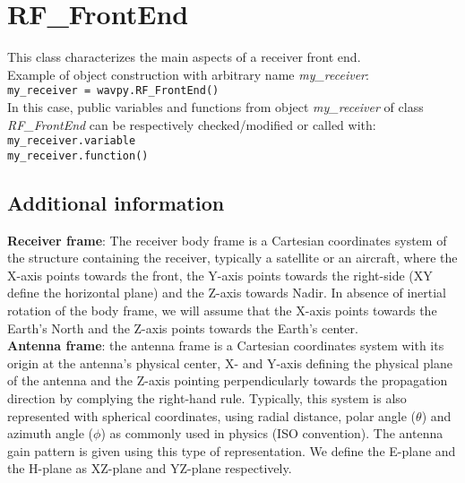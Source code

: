 \chapter{RF\_FrontEnd}\label{cha:rffe}

This class characterizes the main aspects of a receiver front end.\\

Example of object construction with arbitrary name {\it my\_receiver}:\\

\texttt{my\_receiver = wavpy.RF\_FrontEnd()}\\

In this case, public variables and functions from object {\it my\_receiver} of class {\it RF\_FrontEnd} can be respectively checked/modified or called with:\\

\texttt{my\_receiver.variable}\\

\texttt{my\_receiver.function()}\\

\section{Additional information}

{\bf Receiver frame}: The receiver body frame is a Cartesian coordinates system of the structure containing the receiver, typically a satellite or an aircraft, where the X-axis points towards the front, the Y-axis points towards the right-side (XY define the horizontal plane) and the Z-axis towards Nadir. In absence of inertial rotation of the body frame, we will assume that the X-axis points towards the Earth's North and the Z-axis points towards the Earth's center.\\

{\bf Antenna frame}: the antenna frame is a Cartesian coordinates system with its origin at the antenna's physical center, X- and Y-axis defining the physical plane of the antenna and the Z-axis pointing perpendicularly towards the propagation direction by complying the right-hand rule. Typically, this system is also represented with spherical coordinates, using radial distance, polar angle ($\theta$) and azimuth angle ($\phi$) as commonly used in physics (ISO convention). The antenna gain pattern is given using this type of representation. We define the E-plane and the H-plane as XZ-plane and YZ-plane respectively.\\ 

